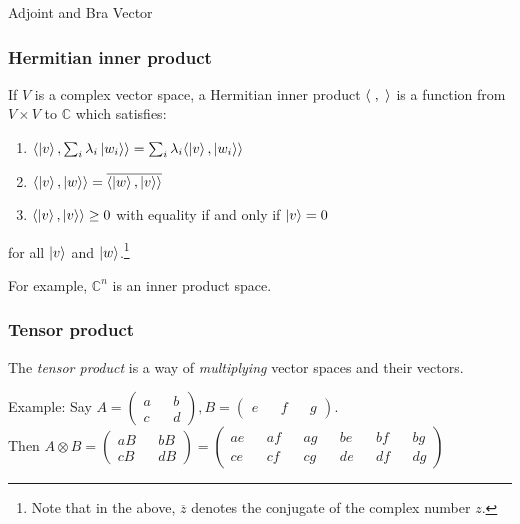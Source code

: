 \documentclass[handout, 10 pt]{beamer}
\begin{document}
\begin{frame}{Adjoint and Bra Vector}

\end{frame}

\begin{frame}
\frametitle{Hermitian inner product}
\vspace{-.2 in}
\pause
If $V$ is a complex vector space, a Hermitian inner product $\langle\hspace{.1cm},\hspace{.1cm}\rangle$ is a function from $V \times V$ to $\mathbb{C}$ which satisfies: 
\pause
\begin{enumerate}
\item $\langle\ket{v}, \sum_i \lambda_i \ket{w_i}\rangle=\sum_i \lambda_i \langle\ket{v}, \ket{w_i}\rangle$
\pause
\item $\langle\ket{v}, \ket{w}\rangle=\overline{\langle\ket{w}, \ket{v}\rangle}$
\pause
\item $\langle\ket{v}, \ket{v}\rangle \ge 0$ \textrm{ with equality if and only if }$\ket{v}=0$
\pause
\end{enumerate}
for all $\ket{v}$ and $\ket{w}$.\footnote{Note that in the above, $\overline{z}$ denotes the conjugate of the complex number $z$.} 

\bigskip
For example, $\mathbb{C}^n$ is an inner product space.
\end{frame}

\begin{frame}
\frametitle{Tensor product}
The \textit{tensor product} is a way of {\emph{multiplying}} vector spaces and their vectors.
\bigskip
\pause

Example: Say $A=\begin{pmatrix}
a && b\\
c && d
\end{pmatrix},
B=\begin{pmatrix}
e && f && g
\end{pmatrix}$.\\
Then $A \otimes B
=\begin{pmatrix}
aB && bB\\
cB && dB
\end{pmatrix}
=\begin{pmatrix} 
ae && af && ag && be && bf && bg\\
ce && cf && cg && de && df && dg
\end{pmatrix}$
\end{frame}
\end{document}
